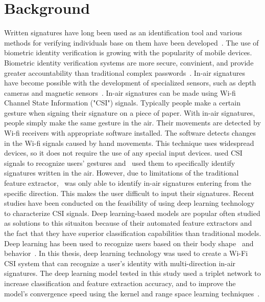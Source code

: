 \section{Background}
Written signatures have long been used as an identification tool and various methods for verifying individuals base on them have been developed~\cite{fahmy2010online,galbally2015line,sanmorino2012survey,sesa2012information}.
The use of biometric identity verification is growing with the popularity of mobile devices. Biometric identity verification systems are more secure, convinient, and provide greater accountability than traditional complex passwords~\cite{hutton2004biometrics}.
In-air signatures have become possible with the development of specialized sensors, such as depth cameras and magnetic sensors~\cite{bailador2011analysis, jeon2012system,ketabdar2012magnetic,malik20183dairsig}.
In-air signatures can be made using Wi-fi Channel State Information ("CSI") signals. Typically people make a certain gesture when signing their signature on a piece of paper. With in-air signatures, people simply make the same gesture in the air. Their movements are detected by Wi-fi receivers with appropriate software installed. The software detects changes in the Wi-fi signals caused by hand movements. This technique uses widespread devices, so it does not require the use of any special input devices. 
\cite{abdelnasser2015wigest,nandakumar2014wi} used CSI signals to recognize users' gestures and~\cite{moon2017air} used them to specifically identify signatures written in the air. 
However, due to limitations of the traditional feature extractor,~\cite{moon2017air} was only able to identify in-air signatures entering from the specific direction. This makes the user difficult to input their signatures.
Recent studies have been conducted on the feasibility of using deep learning technology to characterize CSI signals. Deep learning-based models are popular often studied as solutions to this situaiton because of their automated feature extractors and the fact that they have superior classification capabilities than traditional models. Deep learning has been used to recognize users based on their body shape~\cite{pokkunuru2018neuralwave} and behavior~\cite{shi2017smart}.
In this thesis, deep learning technology was used to create a Wi-Fi CSI system that can recognize a user's identity with multi-direction in-air signatures.
The deep learning model tested in this study used a triplet network to increase classification and feature extraction accuracy, and to improve the model's convergence speed using the kernel and range space learning techniques~\cite{toh2018gradient}.

